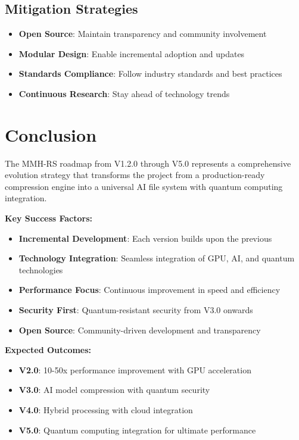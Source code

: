 \documentclass[12pt,a4paper]{article}
\begin{document}
\subsection{Mitigation Strategies}
\begin{itemize}
    \item \textbf{Open Source}: Maintain transparency and community involvement
    \item \textbf{Modular Design}: Enable incremental adoption and updates
    \item \textbf{Standards Compliance}: Follow industry standards and best practices
    \item \textbf{Continuous Research}: Stay ahead of technology trends
\end{itemize}

\newpage

\section{Conclusion}

The MMH-RS roadmap from V1.2.0 through V5.0 represents a comprehensive evolution strategy that transforms the project from a production-ready compression engine into a universal AI file system with quantum computing integration.

\textbf{Key Success Factors:}
\begin{itemize}
    \item \textbf{Incremental Development}: Each version builds upon the previous
    \item \textbf{Technology Integration}: Seamless integration of GPU, AI, and quantum technologies
    \item \textbf{Performance Focus}: Continuous improvement in speed and efficiency
    \item \textbf{Security First}: Quantum-resistant security from V3.0 onwards
    \item \textbf{Open Source}: Community-driven development and transparency
\end{itemize}

\textbf{Expected Outcomes:}
\begin{itemize}
    \item \textbf{V2.0}: 10-50x performance improvement with GPU acceleration
    \item \textbf{V3.0}: AI model compression with quantum security
    \item \textbf{V4.0}: Hybrid processing with cloud integration
    \item \textbf{V5.0}: Quantum computing integration for ultimate performance
\end{itemize}
\end{document}
